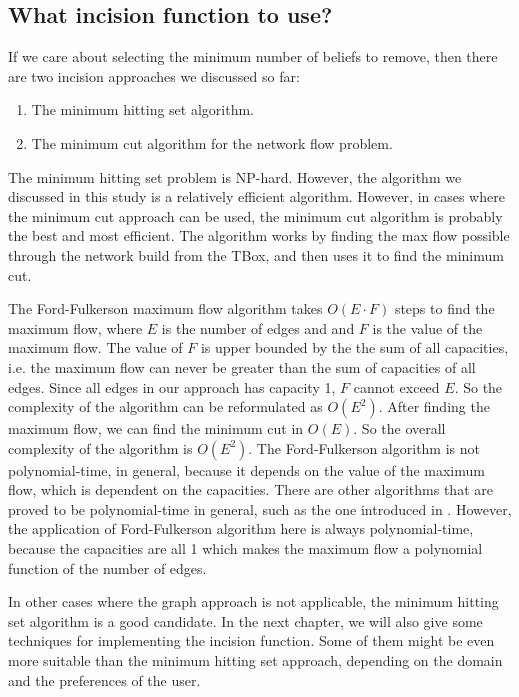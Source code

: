 \subsection{What incision function to use?}
If we care about selecting the minimum number of beliefs to remove, then there are two incision approaches we discussed so far:
\begin{enumerate}
\item The minimum hitting set algorithm.
\item The minimum cut algorithm for the network flow problem.
\end{enumerate}
The minimum hitting set problem is NP-hard. However, the algorithm we discussed in this study is a relatively efficient algorithm. However, in cases where the minimum cut approach can be used, the minimum cut algorithm is probably the best and most efficient. The algorithm works by finding the max flow possible through the network build from the TBox, and then uses it to find the minimum cut.

The Ford-Fulkerson maximum flow algorithm takes $O(E \cdot F)$ steps to find the maximum flow, where $E$ is the number of edges and and $F$ is the value of the maximum flow. The value of $F$ is upper bounded by the the sum of all capacities, i.e. the maximum flow can never be greater than the sum of capacities of all edges. Since all edges in our approach has capacity 1, $F$ cannot exceed $E$. So the complexity of the algorithm can be reformulated as $O(E^2)$. After finding the maximum flow, we can find the minimum cut in $O(E)$. So the overall complexity of the algorithm is $O(E^2)$. The Ford-Fulkerson algorithm is not polynomial-time, in general, because it depends on the value of the maximum flow, which is dependent on the capacities. There are other algorithms that are proved to be polynomial-time in general, such as the one introduced in \cite{preflow}. However, the application of Ford-Fulkerson algorithm here is always polynomial-time, because the capacities are all 1 which makes the maximum flow a polynomial function of the number of edges.

In other cases where the graph approach is not applicable, the minimum hitting set algorithm is a good candidate. In the next chapter, we will also give some techniques for implementing the incision function. Some of them might be even more suitable than the minimum hitting set approach, depending on the domain and the preferences of the user.